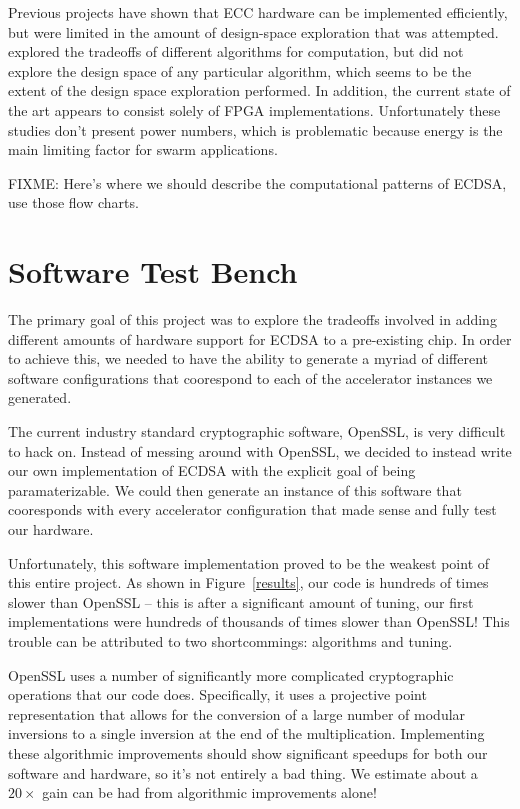 \documentclass[twocolumn]{article}
\begin{document}
Previous projects\cite{nnll-ecdsa_hw} have shown that ECC hardware can
be implemented efficiently, but were limited in the amount of
design-space exploration that was attempted.  \cite{mmm-hw_ecc}
explored the tradeoffs of different algorithms for computation, but
did not explore the design space of any particular algorithm, which
seems to be the extent of the design space exploration performed.  In
addition, the current state of the art appears to consist solely of
FPGA implementations.  Unfortunately these studies don't present power
numbers, which is problematic because energy is the main limiting
factor for swarm applications.

FIXME: Here's where we should describe the computational patterns of
ECDSA, use those flow charts.

\section{Software Test Bench}

The primary goal of this project was to explore the tradeoffs involved
in adding different amounts of hardware support for ECDSA to a
pre-existing chip.  In order to achieve this, we needed to have the
ability to generate a myriad of different software configurations that
coorespond to each of the accelerator instances we generated.

The current industry standard cryptographic software, OpenSSL, is very
difficult to hack on.  Instead of messing around with OpenSSL, we
decided to instead write our own implementation of ECDSA with the
explicit goal of being paramaterizable.  We could then generate an
instance of this software that cooresponds with every accelerator
configuration that made sense and fully test our hardware.

Unfortunately, this software implementation proved to be the weakest
point of this entire project.  As shown in Figure~\ref{results}, our
code is hundreds of times slower than OpenSSL -- this is after a
significant amount of tuning, our first implementations were hundreds
of thousands of times slower than OpenSSL!  This trouble can be
attributed to two shortcommings: algorithms and tuning.

OpenSSL uses a number of significantly more complicated cryptographic
operations that our code does.  Specifically, it uses a projective
point representation that allows for the conversion of a large number
of modular inversions to a single inversion at the end of the multiplication. 
Implementing these algorithmic improvements should show significant speedups for
both our software and hardware, so it's not entirely a bad thing.  We
estimate about a $20\times$ gain can be had from algorithmic
improvements alone!
\end{document}
